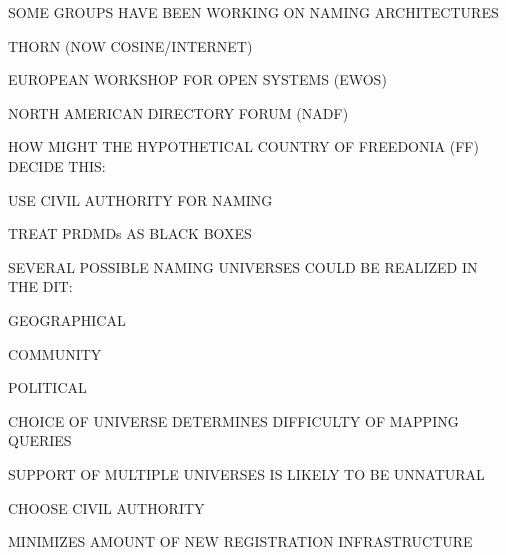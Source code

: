 \begin{bwslide}

\begin{nrtc}
\item	SOME GROUPS HAVE BEEN WORKING ON NAMING ARCHITECTURES
    \begin{nrtc}
    \item	THORN (NOW COSINE/INTERNET)

    \item	EUROPEAN WORKSHOP FOR OPEN SYSTEMS (EWOS)

    \item	NORTH AMERICAN DIRECTORY FORUM (NADF)
    \end{nrtc}

\item	HOW MIGHT THE HYPOTHETICAL COUNTRY OF FREEDONIA (FF)
	DECIDE THIS:
    \begin{nrtc}
    \item	USE CIVIL AUTHORITY FOR NAMING

    \item	TREAT PRDMDs AS BLACK BOXES
    \end{nrtc}
\end{nrtc}
\end{bwslide}


\begin{bwslide}

\begin{nrtc}
\item	SEVERAL POSSIBLE NAMING UNIVERSES COULD BE REALIZED IN THE DIT:
    \begin{nrtc}
    \item	GEOGRAPHICAL

    \item	COMMUNITY

    \item	POLITICAL
    \end{nrtc}

\item	CHOICE OF UNIVERSE DETERMINES DIFFICULTY OF MAPPING QUERIES

\item	SUPPORT OF MULTIPLE UNIVERSES IS LIKELY TO BE UNNATURAL

\item	CHOOSE CIVIL AUTHORITY
    \begin{nrtc}
    \item	MINIMIZES AMOUNT OF NEW REGISTRATION INFRASTRUCTURE
    \end{nrtc}
\end{nrtc}
\end{bwslide}


